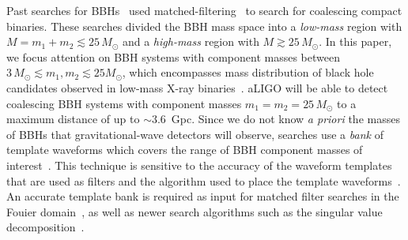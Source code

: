 Past searches for
BBHs~\citep{Colaboration:2011nz,Abadie:2010yb,Abbott:2009qj,Abbott:2009tt,Messaritaki:2005wv}
used matched-filtering~\citep{Wainstein:1962,Allen:2005fk} to search for
coalescing compact binaries. These searches divided the BBH mass space into a
\emph{low-mass} region with $M = m_1 + m_2 \lesssim 25\, M_\odot$ and a
\emph{high-mass} region with $M \gtrsim 25 \, M_\odot$. In this paper, we
focus attention on BBH systems with component masses between $3 \, M_{\odot}
\lesssim m_1, m_2 \lesssim 25 M_{\odot}$, which encompasses mass distribution
of black hole candidates observed in low-mass X-ray
binaries~\cite{Ozel:2010su}. aLIGO will be able to detect coalescing BBH
systems with component masses $m_1 = m_2 = 25 \, M_{\odot}$ to a maximum
distance of up to $\sim 3.6$~Gpc.  Since we do not know \emph{a priori} the
masses of BBHs that gravitational-wave detectors will observe, searches use a
\textit{bank} of template waveforms which covers the range of BBH component
masses of interest~\citep{Sathyaprakash:1991mt,Balasubramanian:1995bm}.  This
technique is sensitive to the accuracy of the waveform templates that are used
as filters and the algorithm used to place the template
waveforms~\citep{FittingFactorApostolatos}. An accurate template bank is
required as input for matched filter
searches in the Fouier domain~\cite{Allen:2005fk}, as well as newer search algorithms such as the
singular value
decomposition~\citep{Cannon:2010qh}. 

